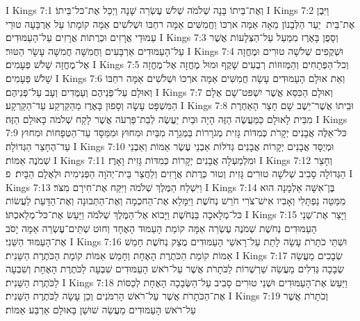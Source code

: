 I Kings 7:1	וְאֶת־בֵּיתוֹ בָּנָה שְׁלֹמֹה שְׁלֹשׁ עֶשְׂרֵה שָׁנָה וַיְכַל אֶת־כּל־בֵּיתוֹ׃
I Kings 7:2	וַיִּבֶן אֶת־בֵּית  יַעַר הַלְּבָנוֹן מֵאָה אַמָּה ארְכּוֹ וַחֲמִשִּׁים אַמָּה רחְבּוֹ וּשְׁלֹשִׁים אַמָּה קוֹמָתוֹ עַל אַרְבָּעָה טוּרֵי עַמּוּדֵי אֲרָזִים וּכְרֻתוֹת אֲרָזִים עַל־הָעַמּוּדִים׃
I Kings 7:3	וְסָפֻן בָּאֶרֶז מִמַּעַל עַל־הַצְּלָעוֹת אֲשֶׁר עַל־הָעַמּוּדִים אַרְבָּעִים וַחֲמִשָּׁה חֲמִשָּׁה עָשָׂר הַטּוּר׃
I Kings 7:4	וּשְׁקֻפִים שְׁלֹשָׁה טוּרִים וּמֶחֱזָה אֶל־מֶחֱזָה שָׁלֹשׁ פְּעָמִים׃
I Kings 7:5	וְכל־הַפְּתָחִים וְהַמְּזוּזוֹת רְבֻעִים שָׁקֶף וּמוּל מֶחֱזָה אֶל־מֶחֱזָה שָׁלֹשׁ פְּעָמִים׃
I Kings 7:6	וְאֵת אוּלָם הָעַמּוּדִים עָשָׂה חֲמִשִּׁים אַמָּה ארְכּוֹ וּשְׁלֹשִׁים אַמָּה רחְבּוֹ וְאוּלָם עַל־פְּנֵיהֶם וְעַמֻּדִים וְעָב עַל־פְּנֵיהֶם׃
I Kings 7:7	וְאוּלָם הַכִּסֵּא אֲשֶׁר יִשְׁפּט־שָׁם אֻלָם הַמִּשְׁפָּט עָשָׂה וְסָפוּן בָּאֶרֶז מֵהַקַּרְקַע עַד־הַקַּרְקָע׃
I Kings 7:8	וּבֵיתוֹ אֲשֶׁר־יֵשֶׁב שָׁם חָצֵר הָאַחֶרֶת מִבֵּית לָאוּלָם כַּמַּעֲשֶׂה הַזֶּה הָיָה וּבַיִת יַעֲשֶׂה לְבַת־פַּרְעֹה אֲשֶׁר לָקַח שְׁלֹמֹה כָּאוּלָם הַזֶּה׃
I Kings 7:9	כּל־אֵלֶּה אֲבָנִים יְקָרֹת כְּמִדּוֹת גָּזִית מְגֹרָרוֹת בַּמְּגֵרָה מִבַּיִת וּמִחוּץ וּמִמַּסָּד עַד־הַטְּפָחוֹת וּמִחוּץ עַד־הֶחָצֵר הַגְּדוֹלָה׃
I Kings 7:10	וּמְיֻסָּד אֲבָנִים יְקָרוֹת אֲבָנִים גְּדֹלוֹת אַבְנֵי עֶשֶׂר אַמּוֹת וְאַבְנֵי שְׁמֹנֶה אַמּוֹת׃
I Kings 7:11	וּמִלְמַעְלָה אֲבָנִים יְקָרוֹת כְּמִדּוֹת גָּזִית וָאָרֶז׃
I Kings 7:12	וְחָצֵר הַגְּדוֹלָה סָבִיב שְׁלֹשָׁה טוּרִים גָּזִית וְטוּר כְּרֻתֹת אֲרָזִים וְלַחֲצַר בֵּית־יְהֹוָה הַפְּנִימִית וּלְאֻלָם הַבָּיִת׃ {פ}
I Kings 7:13	וַיִּשְׁלַח הַמֶּלֶךְ שְׁלֹמֹה וַיִּקַּח אֶת־חִירָם מִצֹּר׃
I Kings 7:14	בֶּן־אִשָּׁה אַלְמָנָה הוּא מִמַּטֵּה נַפְתָּלִי וְאָבִיו אִישׁ־צֹרִי חֹרֵשׁ נְחֹשֶׁת וַיִּמָּלֵא אֶת־הַחכְמָה וְאֶת־הַתְּבוּנָה וְאֶת־הַדַּעַת לַעֲשׂוֹת כּל־מְלָאכָה בַּנְּחֹשֶׁת וַיָּבוֹא אֶל־הַמֶּלֶךְ שְׁלֹמֹה וַיַּעַשׂ אֶת־כּל־מְלַאכְתּוֹ׃
I Kings 7:15	וַיָּצַר אֶת־שְׁנֵי הָעַמּוּדִים נְחֹשֶׁת שְׁמֹנֶה עֶשְׂרֵה אַמָּה קוֹמַת הָעַמּוּד הָאֶחָד וְחוּט שְׁתֵּים־עֶשְׂרֵה אַמָּה יָסֹב אֶת־הָעַמּוּד הַשֵּׁנִי׃
I Kings 7:16	וּשְׁתֵּי כֹתָרֹת עָשָׂה לָתֵת עַל־רָאשֵׁי הָעַמּוּדִים מֻצַק נְחֹשֶׁת חָמֵשׁ אַמּוֹת קוֹמַת הַכֹּתֶרֶת הָאֶחָת וְחָמֵשׁ אַמּוֹת קוֹמַת הַכֹּתֶרֶת הַשֵּׁנִית׃
I Kings 7:17	שְׂבָכִים מַעֲשֵׂה שְׂבָכָה גְּדִלִים מַעֲשֵׂה שַׁרְשְׁרוֹת לַכֹּתָרֹת אֲשֶׁר עַל־רֹאשׁ הָעַמּוּדִים שִׁבְעָה לַכֹּתֶרֶת הָאֶחָת וְשִׁבְעָה לַכֹּתֶרֶת הַשֵּׁנִית׃
I Kings 7:18	וַיַּעַשׂ אֶת־הָעַמּוּדִים וּשְׁנֵי טוּרִים סָבִיב עַל־הַשְּׂבָכָה הָאֶחָת לְכַסּוֹת אֶת־הַכֹּתָרֹת אֲשֶׁר עַל־רֹאשׁ הָרִמֹּנִים וְכֵן עָשָׂה לַכֹּתֶרֶת הַשֵּׁנִית׃
I Kings 7:19	וְכֹתָרֹת אֲשֶׁר עַל־רֹאשׁ הָעַמּוּדִים מַעֲשֵׂה שׁוּשַׁן בָּאוּלָם אַרְבַּע אַמּוֹת׃
